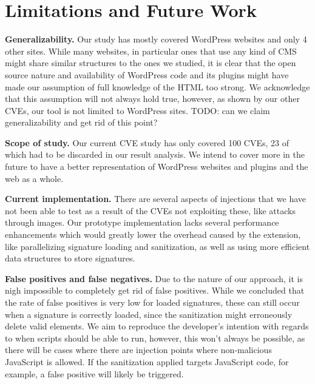 \section{Limitations and Future Work}
\textbf{Generalizability.} Our study has mostly covered WordPress websites and only 4 other sites. While many websites, in particular ones that use any kind of CMS might share similar structures to the ones we studied, it is clear that the open source nature and availability of WordPress code and its plugins might have made our assumption of full knowledge of the HTML too strong. We acknowledge that this assumption will not always hold true, however, as shown by our other CVEs, our tool is not limited to WordPress sites. TODO: can we claim generalizability and get rid of this point?

\textbf{Scope of study.} Our current CVE study has only covered 100 CVEs, 23 of which had to be discarded in our result analysis. We intend to cover more in the future to have a better representation of WordPress websites and plugins and the web as a whole. 

\textbf{Current implementation.} There are several aspects of injections that we have not been able to test as a result of the CVEs not exploiting these, like attacks through images. Our prototype implementation lacks several performance enhancements which would greatly lower the overhead caused by the extension, like parallelizing signature loading and sanitization, as well as using more efficient data structures to store signatures. 

\textbf{False positives and false negatives.} Due to the nature of our approach, it is nigh impossible to completely get rid of false positives. While we concluded that the rate of false positives is very low for loaded signatures, these can still occur when a signature is correctly loaded, since the sanitization might erroneously delete valid elements. We aim to reproduce the developer's intention with regards to when scripts should be able to run, however, this won't always be possible, as there will be cases where there are injection points where non-malicious JavaScript is allowed. If the sanitization applied targets JavaScript code, for example, a false positive will likely be triggered.

